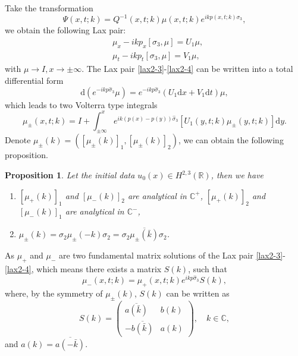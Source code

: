 \documentclass[11pt]{article}
\numberwithin{equation}{section}
\newtheorem{Proposition}{Proposition}
\begin{document}
Take the transformation
\begin{equation}
    \Psi(x,t;k)=Q^{-1}(x,t;k)\mu (x,t;k)e^{ikp(x,t;k)\sigma_3},\label{defPhi}
\end{equation}
we obtain the following Lax pair:
\begin{align}
    &\mu_x-ikp_x\left[\sigma_3,\mu\right]=U_1\mu,\label{lax2-3}\\
    &\mu_t-ikp_t\left[\sigma_3,\mu\right]=V_1\mu,\label{lax2-4}
\end{align}
with $\mu\to I,x\to\pm\infty$. The Lax pair \eqref{lax2-3}-\eqref{lax2-4} can be written into a total differential form
\begin{equation}
    \mathrm{d}\left(e^{-ikp\hat{\sigma}_3}\mu\right)=e^{-ikp\hat{\sigma}_3}\left(U_1\mathrm{d}x+V_1\mathrm{d}t\right)\mu,
\end{equation}
which leads to two Volterra type integrals
\begin{equation}
    \mu_{\pm}(x,t;k)=I+\int_{\pm\infty}^xe^{ik(p(x)-p(y))\hat{\sigma}_3}\left[U_1(y,t;k)\mu_{\pm}(y,t;k)\right]\mathrm{d}y.\label{mupm}
\end{equation}
Denote $\mu_{\pm}(k)=\left(\left[\mu_{\pm}(k)\right]_1,\left[\mu_{\pm}(k)\right]_2\right)$, we can obtain the following proposition.
\begin{Proposition}\label{p2}
    Let the initial data $u_0(x)\in H^{2,3}(\mathbb{R})$, then we have
    \begin{enumerate}
    [label=\textnormal{(\arabic*)}]
        \item $\left[\mu_{+}(k)\right]_1$ and $\left[\mu_{-}(k)\right]_2$ are analytical in $\mathbb{C}^+$,
 $\left[\mu_{+}(k)\right]_2$ and $\left[\mu_{-}(k)\right]_1$ are analytical in $\mathbb{C}^-$,
 \item $ \mu_{\pm}(k)=\sigma_2\mu_{\pm}(-k)\sigma_2=\sigma_2\overline{\mu_{\pm}(\bar{k})}\sigma_2$.
    \end{enumerate}
\end{Proposition}


 As $\mu_+$ and $\mu_-$ are two fundamental matrix solutions of the Lax pair \eqref{lax2-3}-\eqref{lax2-4}, which means there exists a matrix $S(k)$, such that
 \begin{equation}
     \mu_-(x,t;k)=\mu_+(x,t;k)e^{ikp\hat{\sigma}_3}S(k),\label{rmu}
 \end{equation}
where, by  the symmetry of $\mu_{\pm}(k)$,  $S(k)$ can be written  as
 \begin{equation*}
     S(k)=\left(\begin{array}{cc}
         \overline{a(\bar{k})} & b(k) \\
         -\overline{b(\bar{k})} & a(k)
     \end{array}\right),\quad k\in\mathbb{C},
 \end{equation*}
and $a(k)=\overline{a(-\bar{k})}$.
\end{document}
